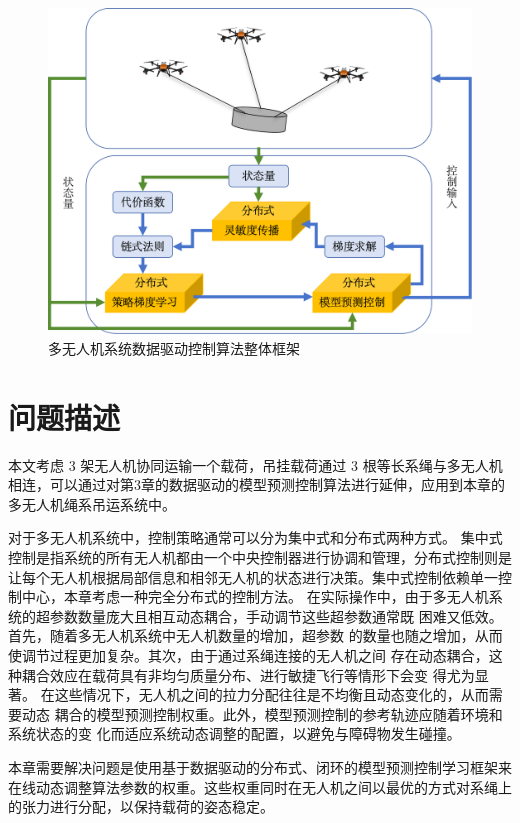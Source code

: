 \documentclass[lang=chs, degree=master, blindreview=false, winfonts=true]{yanputhesis}
\begin{document}
\begin{figure}[hbt!]
	\centering
	\includegraphics[width=38pc]{picture/4_1.png} 
	\caption{多无人机系统数据驱动控制算法整体框架} 
	\label{4_1}
\end{figure}


\section{问题描述}
本文考虑 3 架无人机协同运输一个载荷，吊挂载荷通过 3 根等长系绳与多无人机相连，可以通过对第3章的数据驱动的模型预测控制算法进行延伸，应用到本章的多无人机绳系吊运系统中。

对于多无人机系统中，控制策略通常可以分为集中式和分布式两种方式。
集中式控制是指系统的所有无人机都由一个中央控制器进行协调和管理，分布式控制则是让每个无人机根据局部信息和相邻无人机的状态进行决策。集中式控制依赖单一控制中心，本章考虑一种完全分布式的控制方法。
在实际操作中，由于多无人机系统的超参数数量庞大且相互动态耦合，手动调节这些超参数通常既
困难又低效。首先，随着多无人机系统中无人机数量的增加，超参数
的数量也随之增加，从而使调节过程更加复杂。其次，由于通过系绳连接的无人机之间
存在动态耦合，这种耦合效应在载荷具有非均匀质量分布、进行敏捷飞行等情形下会变
得尤为显著。
在这些情况下，无人机之间的拉力分配往往是不均衡且动态变化的，从而需要动态
耦合的模型预测控制权重。此外，模型预测控制的参考轨迹应随着环境和系统状态的变
化而适应系统动态调整的配置，以避免与障碍物发生碰撞。

本章需要解决问题是使用基于数据驱动的分布式、闭环的模型预测控制学习框架来在线动态调整算法参数的权重。这些权重同时在无人机之间以最优的方式对系绳上的张力进行分配，以保持载荷的姿态稳定。
\end{document}
